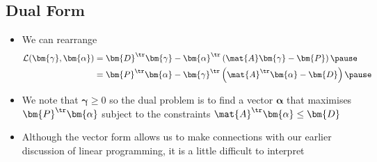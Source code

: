 
\begin{slide}
\section{Dual Form}

\begin{PauseHighLight}
  \begin{itemize}
  \item We can rearrange
    \begin{align*}
      \mathcal{L}(\bm{\gamma},\bm{\alpha})
      &= \bm{D}^\tr \bm{\gamma} - \bm{\alpha}^\tr \left(
        \mat{A} \bm{\gamma} - \bm{P}\right)\pause \\
      &= \bm{P}^\tr \bm{\alpha} - \bm{\gamma}^\tr \left(
        \mat{A}^\tr \bm{\alpha} - \bm{D}\right)\pause
    \end{align*}
  \item We note that $\bm{\gamma}\geq 0$ so the dual problem is to
    find a vector $\bm{\alpha}$ that maximises $\bm{P}^\tr
    \bm{\alpha}$ subject to the constraints $\mat{A}^\tr \bm{\alpha}
    \leq \bm{D}$\pause
  \item Although the vector form allows us to make connections with
    our earlier discussion of linear programming, it is a little
    difficult to interpret\pause
  \end{itemize}
\end{PauseHighLight}

\end{slide}


